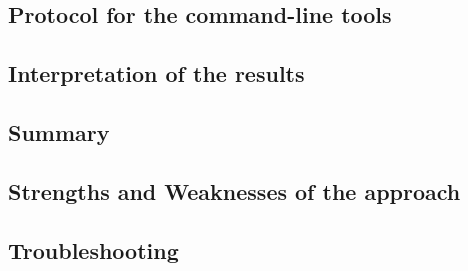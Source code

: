 \subsection{Protocol for the command-line tools}

\subsection{Interpretation of the results}

\subsection{Summary}

\subsection{Strengths and Weaknesses of the approach}

\subsection{Troubleshooting}









